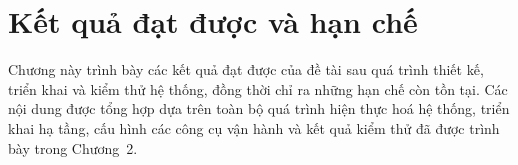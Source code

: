 

  

\chapter{Kết quả đạt được và hạn chế}
\label{chap:chap3-result-limit}

Chương này trình bày các kết quả đạt được của đề tài sau quá trình thiết kế, triển
khai và kiểm thử hệ thống, đồng thời chỉ ra những hạn chế còn tồn tại. Các nội dung
được tổng hợp dựa trên toàn bộ quá trình hiện thực hoá hệ thống, triển khai hạ tầng,
cấu hình các công cụ vận hành và kết quả kiểm thử đã được trình bày trong Chương~2.


